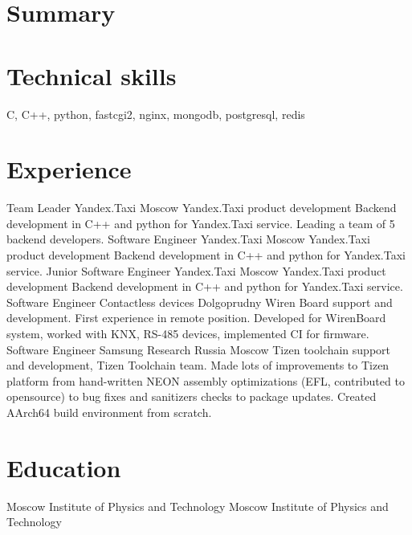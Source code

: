 \documentclass[12pt,a4paper]{moderncv}
\begin{document}
\makecvtitle
\section{Summary}

\section{Technical skills}
\cvline
  {}{C, C++, python, fastcgi2, nginx, mongodb, postgresql, redis}

\section{Experience}
 {Team Leader} {Yandex.Taxi} {Moscow} {}
        {Yandex.Taxi product development\newline{}
        Backend development in C++ and python for Yandex.Taxi service. Leading a team of 5 backend developers.
}
 {Software Engineer} {Yandex.Taxi} {Moscow} {}
        {Yandex.Taxi product development\newline{}
        Backend development in C++ and python for Yandex.Taxi service.
}
 {Junior Software Engineer} {Yandex.Taxi} {Moscow} {}
        {Yandex.Taxi product development\newline{}
        Backend development in C++ and python for Yandex.Taxi service.
}
 {Software Engineer} {Contactless devices} {Dolgoprudny} {}
        {Wiren Board support and development.\newline{}
        First experience in remote position. Developed for WirenBoard system, worked with KNX,
        RS-485 devices, implemented CI for firmware.
}
 {Software Engineer} {Samsung Research Russia} {Moscow} {}
        {Tizen toolchain support and development, Tizen Toolchain team.\newline{}
        Made lots of improvements to Tizen platform from hand-written NEON assembly optimizations
        (EFL, contributed to opensource\footnotemark[1]) to bug fixes and sanitizers checks to package updates.
        Created AArch64 build environment from scratch.
}

\section{Education}
\label{sec:edu}
        {Moscow Institute of Physics and Technology}{}{}{}
        {Moscow Institute of Physics and Technology}{}{}{}

\end{document}
